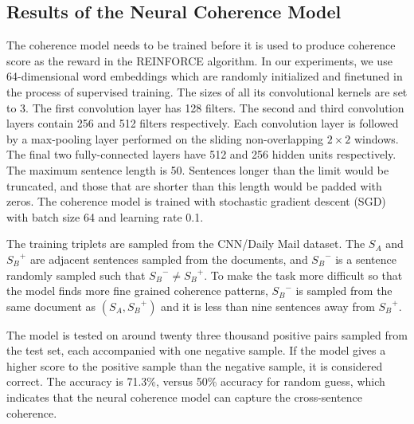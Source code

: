 \documentclass[letterpaper]{article} \usepackage{aaai18}  \usepackage{times}  \usepackage{helvet}  \usepackage{courier}  \usepackage{url}  \usepackage{graphicx}  \usepackage{amssymb}
\begin{document}
	\subsection{Results of the Neural Coherence Model}
	The coherence model needs to be trained before it is used to produce coherence score as the reward in the REINFORCE algorithm. In our experiments,  we use 64-dimensional word embeddings which are randomly initialized and finetuned in the process of supervised training. The sizes of all its convolutional kernels are set to 3. The first convolution layer has 128 filters. The second and third convolution layers contain 256 and 512 filters respectively. Each convolution layer is followed by a max-pooling layer performed on the sliding non-overlapping $2\times2$ windows. The final two fully-connected layers have 512 and 256 hidden units respectively. The maximum sentence length is 50. Sentences longer than the limit would be truncated, and those that are shorter than this length would be padded with zeros. The coherence model is trained with stochastic gradient descent (SGD) with batch size 64 and learning rate 0.1. 
	
	The training triplets are sampled from the CNN/Daily Mail dataset. The $S_A$ and ${S_B}^{+}$ are adjacent sentences sampled from the documents, and ${S_B}^{-}$ is a sentence randomly sampled such that ${S_B}^{-} \neq {S_B}^{+}$. To make the task more difficult so that the model finds more fine grained coherence patterns, ${S_B}^{-}$ is sampled from the same document as $(S_A, {S_B}^{+})$ and it is less than nine sentences away from ${S_B}^{+}$.
	
	The model is tested on around twenty three thousand positive pairs sampled from the test set, each accompanied with one negative sample. If the model gives a higher score to the positive sample than the negative sample, it is considered correct. The accuracy is 71.3\%, versus 50\% accuracy for random guess, which indicates that the neural coherence model can capture the cross-sentence coherence.
	
\end{document}
